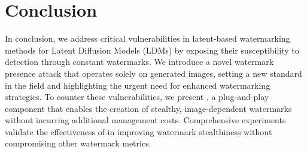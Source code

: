 \section{Conclusion}
In conclusion, we address critical vulnerabilities in latent-based watermarking methods for Latent Diffusion Models (LDMs) by exposing their susceptibility to detection through constant watermarks. We introduce a novel watermark presence attack that operates solely on generated images, setting a new standard in the field and highlighting the urgent need for enhanced watermarking strategies.
To counter these vulnerabilities, we present \tool, a plug-and-play component that enables the creation of stealthy, image-dependent watermarks without incurring additional management costs. 
Comprehensive experiments validate the effectiveness of \tool in improving watermark stealthiness without compromising other watermark metrics. 
